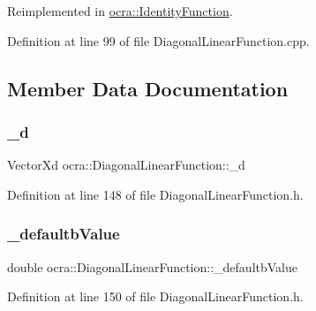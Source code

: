 Reimplemented in \hyperlink{classocra_1_1IdentityFunction_afd77529674b7b6db3db2542aaeedbb16}{ocra\+::\+Identity\+Function}.



Definition at line 99 of file Diagonal\+Linear\+Function.\+cpp.



\subsection{Member Data Documentation}
\hypertarget{classocra_1_1DiagonalLinearFunction_adf9d157af394f4322d71720bea545f00}{}\label{classocra_1_1DiagonalLinearFunction_adf9d157af394f4322d71720bea545f00} 
\subsubsection{\texorpdfstring{\+\_\+d}{\_d}}
{\footnotesize\ttfamily Vector\+Xd ocra\+::\+Diagonal\+Linear\+Function\+::\+\_\+d\hspace{0.3cm}{\ttfamily [protected]}}



Definition at line 148 of file Diagonal\+Linear\+Function.\+h.

\hypertarget{classocra_1_1DiagonalLinearFunction_ab004421a9f01bd2c3fa5b97b7532c6c2}{}\label{classocra_1_1DiagonalLinearFunction_ab004421a9f01bd2c3fa5b97b7532c6c2} 
\subsubsection{\texorpdfstring{\+\_\+defaultb\+Value}{\_defaultbValue}}
{\footnotesize\ttfamily double ocra\+::\+Diagonal\+Linear\+Function\+::\+\_\+defaultb\+Value\hspace{0.3cm}{\ttfamily [protected]}}



Definition at line 150 of file Diagonal\+Linear\+Function.\+h.

\hypertarget{classocra_1_1DiagonalLinearFunction_aa7150368fce9c7c6c3724b801f498749}{}\label{classocra_1_1DiagonalLinearFunction_aa7150368fce9c7c6c3724b801f498749} 
